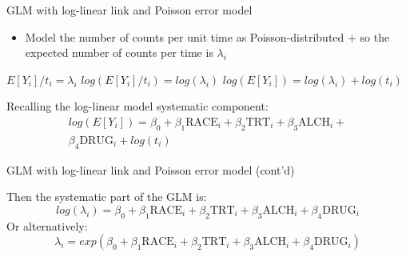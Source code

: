 \documentclass[ignorenonframetext,]{beamer}
\providecommand{\tightlist}{%
  \setlength{\itemsep}{0pt}\setlength{\parskip}{0pt}}
\begin{document}
\begin{frame}{GLM with log-linear link and Poisson error model}
\protect\hypertarget{glm-with-log-linear-link-and-poisson-error-model}{}

\begin{itemize}
\tightlist
\item
  Model the number of counts per unit time as Poisson-distributed + so
  the expected number of counts per time is \(\lambda_i\)
\end{itemize}

\(E[Y_i]/t_i = \lambda_i\) \newline \(log(E[Y_i]/t_i) = log(\lambda_i)\)
\newline \(log(E[Y_i]) = log(\lambda_i) + log(t_i)\) \newline

Recalling the log-linear model systematic component: \[
\begin{aligned}
log(E[Y_i]) = \beta_0 + \beta_1 \textrm{RACE}_i + \beta_2 \textrm{TRT}_i + 
\beta_3 \textrm{ALCH}_i + \nonumber \\ \beta_4 \textrm{DRUG}_i + log(t_i)
\end{aligned}
\]

\end{frame}

\begin{frame}{GLM with log-linear link and Poisson error model (cont'd)}
\protect\hypertarget{glm-with-log-linear-link-and-poisson-error-model-contd}{}

Then the systematic part of the GLM is: \[
log(\lambda_i) = \beta_0 + \beta_1 \textrm{RACE}_i + \beta_2 \textrm{TRT}_i + \beta_3 \textrm{ALCH}_i + \beta_4 \textrm{DRUG}_i
\] Or alternatively: \[
\lambda_i = exp \left( \beta_0 + \beta_1 \textrm{RACE}_i + \beta_2 \textrm{TRT}_i + \beta_3 \textrm{ALCH}_i + \beta_4 \textrm{DRUG}_i \right)
\]

\end{frame}
\end{document}
